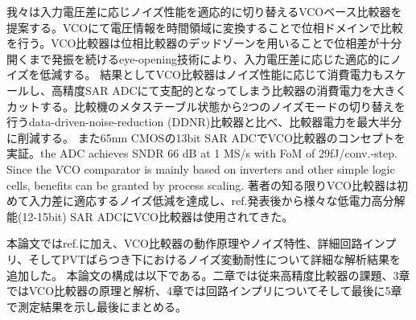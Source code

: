 \documentclass[letterpaper, 10 pt, conference]{ieeeconf}  %
\begin{document}
我々は入力電圧差に応じノイズ性能を適応的に切り替えるVCOベース比較器を提案する\cite{yoshioka201413b}。VCOにて電圧情報を時間領域に変換することで位相ドメインで比較を行う。VCO比較器は位相比較器のデッドゾーンを用いることで位相差が十分開くまで発振を続けるeye-opening技術により、入力電圧差に応じた適応的にノイズを低減する。
結果としてVCO比較器はノイズ性能に応じて消費電力もスケールし、高精度SAR ADCにて支配的となってしまう比較器の消費電力を大きくカットする。比較機のメタステーブル状態から2つのノイズモードの切り替えを行うdata-driven-noise-reduction (DDNR)比較器\cite{harpe201310b}と比べ、比較器電力を最大半分に削減する。
また65nm CMOSの13bit SAR ADCでVCO比較器のコンセプトを実証。the ADC achieves SNDR 66 dB at 1 MS/s with FoM of 29fJ/conv.-step. Since the VCO comparator is mainly based on inverters and other simple logic cells, benefits can be granted by process scaling.
著者の知る限りVCO比較器は初めて入力差に適応するノイズ低減を達成し、ref.\cite{yoshioka201413b}発表後から様々な低電力高分解能(12-15bit) SAR ADCにVCO比較器は使用されてきた\cite{ding20190, luo2020input, hsieh20180, li2019design, li202065, almarashli2017nyquist, shim2017edge, zhu201914, pan202012, lee2019fast}。

本論文ではref.\cite{yoshioka201413b}に加え、VCO比較器の動作原理やノイズ特性、詳細回路インプリ、そしてPVTばらつき下におけるノイズ変動耐性について詳細な解析結果を追加した。
本論文の構成は以下である。二章では従来高精度比較器の課題、3章ではVCO比較器の原理と解析、4章では回路インプリについてそして最後に5章で測定結果を示し最後にまとめる。
\end{document}
